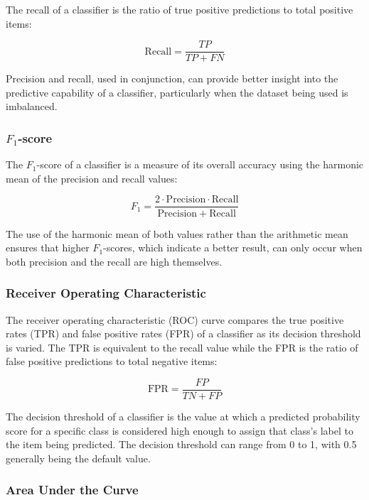 The recall of a classifier is the ratio of true positive predictions to total positive items:

\begin{equation*}
    \mathrm{Recall} = \frac{TP}{TP + FN}
\end{equation*}

Precision and recall, used in conjunction, can provide better insight into the predictive capability of a classifier, particularly when the dataset being used is imbalanced.

\subsubsection{$F_1$-score}

The $F_1$-score of a classifier is a measure of its overall accuracy using the harmonic mean of the precision and recall values:

\begin{equation*}
    F_1 = \frac{2 \cdot \mathrm{Precision} \cdot \mathrm{Recall}}{\mathrm{Precision} + \mathrm{Recall}}
\end{equation*}

The use of the harmonic mean of both values rather than the arithmetic mean ensures that higher $F_1$-scores, which indicate a better result, can only occur when both precision and the recall are high themselves.

\subsubsection{Receiver Operating Characteristic}

The receiver operating characteristic (ROC) curve compares the true positive rates (TPR) and false positive rates (FPR) of a classifier as its decision threshold is varied. The TPR is equivalent to the recall value while the FPR is the ratio of false positive predictions to total negative items:

\begin{equation*}
    \mathrm{FPR} = \frac{FP}{TN + FP}
\end{equation*}

The decision threshold of a classifier is the value at which a predicted probability score for a specific class is considered high enough to assign that class's label to the item being predicted. The decision threshold can range from 0 to 1, with 0.5 generally being the default value.

\subsubsection{Area Under the Curve}

